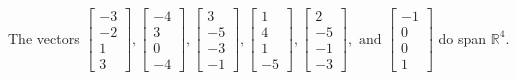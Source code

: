 \begin{exercise}
\begin{exerciseStatement}
  \end{exerciseStatement}
  \begin{exerciseAnswer}
   The vectors \(\left[\begin{array}{r}
-3 \\
-2 \\
1 \\
3
\end{array}\right] , \left[\begin{array}{r}
-4 \\
3 \\
0 \\
-4
\end{array}\right] , \left[\begin{array}{r}
3 \\
-5 \\
-3 \\
-1
\end{array}\right] , \left[\begin{array}{r}
1 \\
4 \\
1 \\
-5
\end{array}\right] , \left[\begin{array}{r}
2 \\
-5 \\
-1 \\
-3
\end{array}\right] , \text{ and } \left[\begin{array}{r}
-1 \\
0 \\
0 \\
1
\end{array}\right]\) 
  	 do  
	span \(\mathbb{R}^4\).
  


  \end{exerciseAnswer}
\end{exercise}